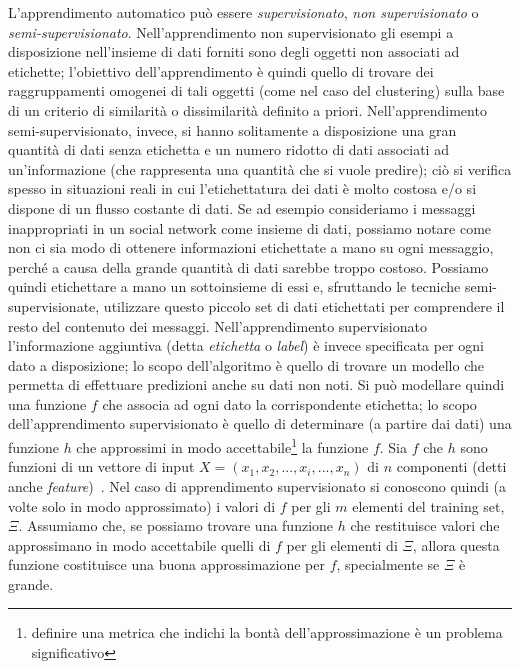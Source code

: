 \documentclass[oneside, openany]{book}
\begin{document}
		L'apprendimento automatico può essere \textit{supervisionato}, \textit{non supervisionato} o \textit{semi-supervisionato}. Nell'apprendimento non supervisionato gli esempi a disposizione nell'insieme di dati forniti sono degli oggetti non associati ad etichette; l'obiettivo dell'apprendimento è quindi quello di trovare dei raggruppamenti omogenei di tali oggetti (come nel caso del clustering) sulla base di un criterio di similarità o dissimilarità definito a priori. Nell'apprendimento semi-supervisionato, invece, si hanno solitamente a disposizione una gran quantità di dati senza etichetta e un numero ridotto di dati associati ad un'informazione (che rappresenta una quantità che si vuole predire); ciò si verifica spesso in situazioni reali in cui l’etichettatura dei dati è molto costosa e/o si dispone di un flusso costante di dati. Se ad esempio consideriamo i messaggi inappropriati in un social network come insieme di dati, possiamo notare come non ci sia modo di ottenere informazioni etichettate a mano su ogni messaggio, perché a causa della grande quantità di dati sarebbe troppo costoso. Possiamo quindi etichettare a mano un sottoinsieme di essi e, sfruttando le tecniche semi-supervisionate, utilizzare questo piccolo set di dati etichettati per comprendere il resto del contenuto dei messaggi.\newline
		Nell'apprendimento supervisionato l'informazione aggiuntiva (detta \textit{etichetta} o \textit{label}) è invece specificata per ogni dato a disposizione; lo scopo dell'algoritmo è quello di trovare un modello che permetta di effettuare predizioni anche su dati non noti.
		Si può modellare quindi una funzione $f$ che associa ad ogni dato la corrispondente etichetta; lo scopo dell'apprendimento supervisionato è quello di determinare (a partire dai dati) una funzione $h$ che approssimi in modo accettabile\footnote{definire una metrica che indichi la bontà dell'approssimazione è un problema significativo} la funzione $f$. Sia $f$ che $h$ sono funzioni di un vettore di input $X=(x_1,x_2,...,x_i,...,x_n)$ di $n$ componenti (detti anche \textit{feature})~\cite{bib:ml}.
		Nel caso di apprendimento supervisionato si conoscono quindi (a volte solo in modo approssimato) i valori di $f$ per gli $m$ elementi del training set, $\Xi$. Assumiamo che, se possiamo trovare una funzione $h$ che restituisce valori che approssimano in modo accettabile quelli di $f$ per gli elementi di $\Xi$, allora questa funzione costituisce una buona approssimazione per $f$, specialmente se $\Xi$ è grande.
		
\end{document}
